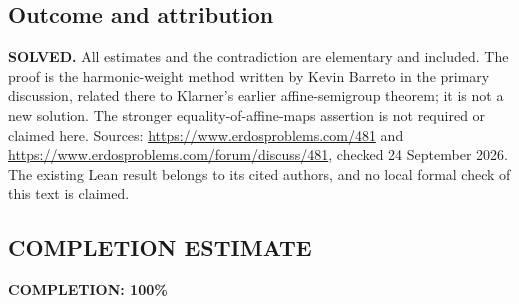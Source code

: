 \subsection*{Outcome and attribution}
\textbf{SOLVED.} All estimates and the contradiction are elementary and included. The proof is the harmonic-weight method written by Kevin Barreto in the primary discussion, related there to Klarner's earlier affine-semigroup theorem; it is not a new solution. The stronger equality-of-affine-maps assertion is not required or claimed here.
Sources: \url{https://www.erdosproblems.com/481} and \url{https://www.erdosproblems.com/forum/discuss/481}, checked 24 September 2026. The existing Lean result belongs to its cited authors, and no local formal check of this text is claimed.

\subsection*{COMPLETION ESTIMATE}
\textbf{COMPLETION: 100\%}

